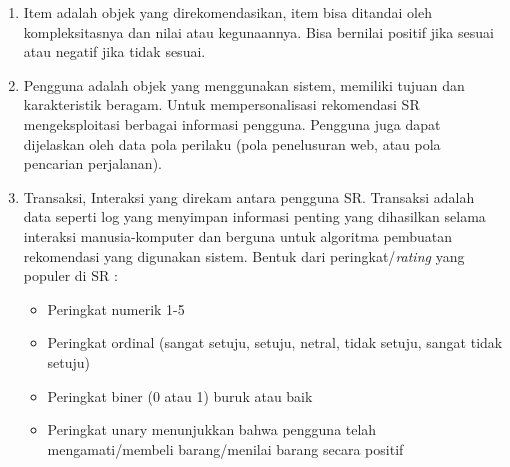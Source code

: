 \documentclass[a4paper,twoside]{article}
\begin{document}
\begin{enumerate}
		\begin{enumerate}
			\item Item adalah objek yang direkomendasikan, item bisa ditandai oleh kompleksitasnya dan nilai atau kegunaannya. Bisa bernilai positif jika sesuai atau negatif jika tidak sesuai.
			\item Pengguna adalah objek yang menggunakan sistem, memiliki tujuan dan karakteristik beragam. Untuk mempersonalisasi rekomendasi SR mengeksploitasi berbagai informasi pengguna. Pengguna juga dapat dijelaskan oleh data pola perilaku (pola penelusuran web, atau pola  pencarian perjalanan).
			\item Transaksi, Interaksi yang direkam antara pengguna SR. Transaksi adalah data seperti log yang menyimpan informasi penting yang dihasilkan selama interaksi manusia-komputer dan berguna untuk algoritma pembuatan rekomendasi yang digunakan sistem. Bentuk dari peringkat/\textit{rating} yang populer di SR :
				\begin{itemize}
					\item Peringkat numerik 1-5
					\item Peringkat ordinal (sangat setuju, setuju, netral, tidak setuju, sangat tidak setuju)
					\item Peringkat biner (0 atau 1) buruk atau baik
					\item Peringkat unary menunjukkan bahwa pengguna telah mengamati/membeli barang/menilai barang secara positif
				\end{itemize}
		\end{enumerate}		 
		

\end{enumerate}
\end{document}
